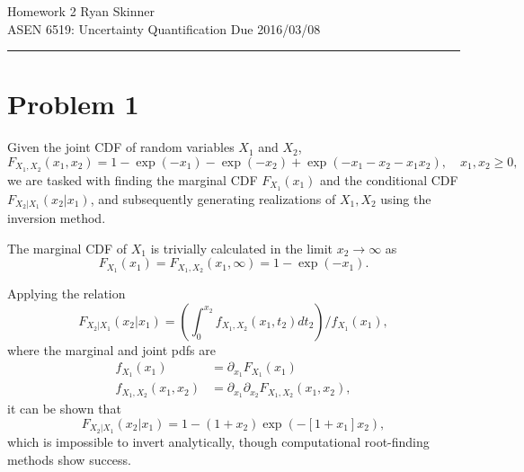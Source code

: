 \documentclass[11pt]{article}
\begin{document}
\newcommand{\widesim}[2][1.5]{
  \mathrel{\overset{#2}{\scalebox{#1}[1]{$\sim$}}}
}

\renewcommand*{\arraystretch}{1.5}

\pagestyle{fancyplain}
\lhead{}
\chead{}
\rhead{}
\cfoot{\hrule \thepage}

\noindent
{\Large Homework 2}
\hfill
{\large Ryan Skinner}
\\[0.5ex]
{\large ASEN 6519: Uncertainty Quantification}
\hfill
{\large Due 2016/03/08}\\
\hrule
\vspace{6pt}

\section*{Problem 1} %

Given the joint CDF of random variables $X_1$ and $X_2$,
\begin{equation}
F_{X_1,X_2}(x_1,x_2) = 1 - \exp(-x_1) - \exp(-x_2) + \exp(-x_1-x_2-x_1x_2)
, \quad x_1,x_2 \ge 0,
\end{equation}
we are tasked with finding the marginal CDF $F_{X_1}(x_1)$ and the conditional CDF $F_{X_2|X_1}(x_2|x_1)$, and subsequently generating realizations of $X_1,X_2$ using the inversion method.

The marginal CDF of $X_1$ is trivially calculated in the limit $x_2 \rightarrow \infty$ as
\begin{equation}
\boxed{F_{X_1}(x_1)} = F_{X_1,X_2}(x_1,\infty) = 1 - \exp(-x_1)
.
\end{equation}

Applying the relation
\begin{equation}
F_{X_2|X_1}(x_2|x_1) = \left( \int_0^{x_2} f_{X_1,X_2}(x_1,t_2) dt_2 \right) \Big/ f_{X_1}(x_1)
,
\end{equation}
where the marginal and joint pdfs are
\begin{align*}
f_{X_1}(x_1) &= \partial_{x_1} F_{X_1}(x_1) \\
f_{X_1,X_2}(x_1,x_2) &= \partial_{x_1} \partial_{x_2} F_{X_1,X_2}(x_1,x_2)
,
\end{align*}
it can be shown that
\begin{equation}
\boxed{F_{X_2|X_1}(x_2|x_1)} = 1 - (1+x_2) \exp(-[1+x_1]x_2)
,
\end{equation}
which is impossible to invert analytically, though computational root-finding methods show success.
\end{document}
